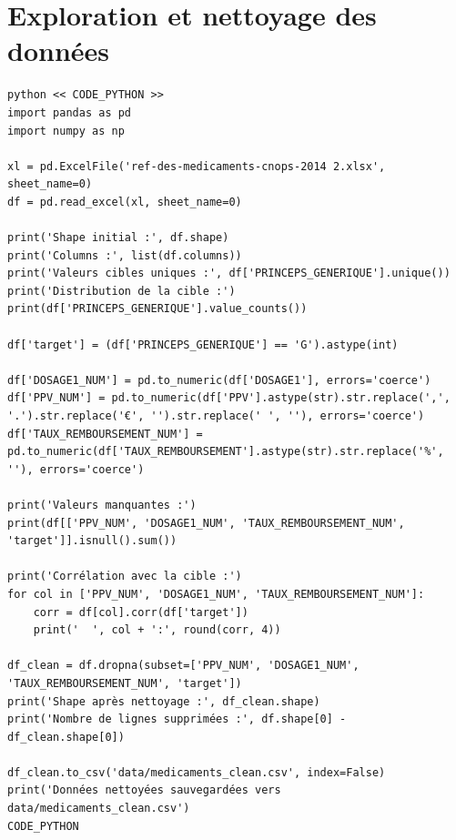 \documentclass[12pt,a4paper]{report}
\begin{document}
\section{Exploration et nettoyage des données}
\begin{verbatim}
python << CODE_PYTHON >>
import pandas as pd
import numpy as np

xl = pd.ExcelFile('ref-des-medicaments-cnops-2014 2.xlsx', sheet_name=0)
df = pd.read_excel(xl, sheet_name=0)

print('Shape initial :', df.shape)
print('Columns :', list(df.columns))
print('Valeurs cibles uniques :', df['PRINCEPS_GENERIQUE'].unique())
print('Distribution de la cible :')
print(df['PRINCEPS_GENERIQUE'].value_counts())

df['target'] = (df['PRINCEPS_GENERIQUE'] == 'G').astype(int)

df['DOSAGE1_NUM'] = pd.to_numeric(df['DOSAGE1'], errors='coerce')
df['PPV_NUM'] = pd.to_numeric(df['PPV'].astype(str).str.replace(',', '.').str.replace('€', '').str.replace(' ', ''), errors='coerce')
df['TAUX_REMBOURSEMENT_NUM'] = pd.to_numeric(df['TAUX_REMBOURSEMENT'].astype(str).str.replace('%', ''), errors='coerce')

print('Valeurs manquantes :')
print(df[['PPV_NUM', 'DOSAGE1_NUM', 'TAUX_REMBOURSEMENT_NUM', 'target']].isnull().sum())

print('Corrélation avec la cible :')
for col in ['PPV_NUM', 'DOSAGE1_NUM', 'TAUX_REMBOURSEMENT_NUM']:
    corr = df[col].corr(df['target'])
    print('  ', col + ':', round(corr, 4))

df_clean = df.dropna(subset=['PPV_NUM', 'DOSAGE1_NUM', 'TAUX_REMBOURSEMENT_NUM', 'target'])
print('Shape après nettoyage :', df_clean.shape)
print('Nombre de lignes supprimées :', df.shape[0] - df_clean.shape[0])

df_clean.to_csv('data/medicaments_clean.csv', index=False)
print('Données nettoyées sauvegardées vers data/medicaments_clean.csv')
CODE_PYTHON
\end{verbatim}
\end{document}
